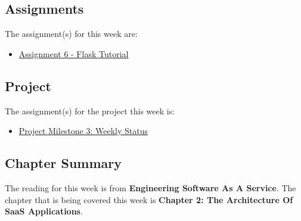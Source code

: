 \subsection{Assignments}

The assignment(s) for this week are:

\begin{itemize}
    \item \href{https://github.com/cu-cspb-3308-software-dev-summer-2024/lab-6-QuantumCompiler}{Assignment 6 - Flask Tutorial}
\end{itemize}

\subsection{Project}

The assignment(s) for the project this week is:

\begin{itemize}
    \item \href{https://applied.cs.colorado.edu/mod/assign/view.php?id=61352}{Project Milestone 3: Weekly Status}
\end{itemize}

\subsection{Chapter Summary}

The reading for this week is from \textbf{Engineering Software As A Service}. The chapter that is being covered this week is \textbf{Chapter 2: The Architecture Of SaaS Applications}.

